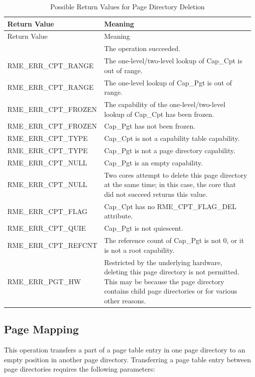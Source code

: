\begin{xltabular}{\textwidth}{@{}>{\hsize\raggedright\arraybackslash}X>{\hsize\raggedright\arraybackslash}X@{}}
\caption{Possible Return Values for Page Directory Deletion}\label{tab:3-13-delete-page-directory-return-values}\\
\toprule
Return Value & Meaning\tabularnewline
\endfirsthead
\toprule
Return Value & Meaning\tabularnewline
\midrule
\endhead
\bottomrule
{} & The operation succeeded.\tabularnewline
    RME\_ERR\_CPT\_RANGE & The one-level/two-level lookup of Cap\_Cpt is out of range.\tabularnewline
    RME\_ERR\_CPT\_RANGE & The one-level lookup of Cap\_Pgt is out of range.\tabularnewline
    RME\_ERR\_CPT\_FROZEN & The capability of the one-level/two-level lookup of Cap\_Cpt has been frozen.\tabularnewline
    RME\_ERR\_CPT\_FROZEN & Cap\_Pgt has not been frozen.\tabularnewline
    RME\_ERR\_CPT\_TYPE & Cap\_Cpt is not a capability table capability.\tabularnewline
    RME\_ERR\_CPT\_TYPE & Cap\_Pgt is not a page directory capability.\tabularnewline
    RME\_ERR\_CPT\_NULL & Cap\_Pgt is an empty capability.\tabularnewline
    RME\_ERR\_CPT\_NULL & Two cores attempt to delete this page directory at the same time; in this case, the core that did not succeed returns this value.\tabularnewline
    RME\_ERR\_CPT\_FLAG & Cap\_Cpt has no RME\_CPT\_FLAG\_DEL attribute.\tabularnewline
    RME\_ERR\_CPT\_QUIE & Cap\_Pgt is not quiescent.\tabularnewline
    RME\_ERR\_CPT\_REFCNT & The reference count of Cap\_Pgt is not 0, or it is not a root capability.\tabularnewline
    RME\_ERR\_PGT\_HW & Restricted by the underlying hardware, deleting this page directory is not permitted. This may be because the page directory contains child page directories or for various other reasons.\tabularnewline
\end{xltabular}
\nopagebreak[4]

\subsection{Page Mapping}\label{subsec:3-map-memory-page}

This operation transfers a part of a page table entry in one page directory to an empty position in another page directory. Transferring a page table entry between page directories requires the following parameters:

